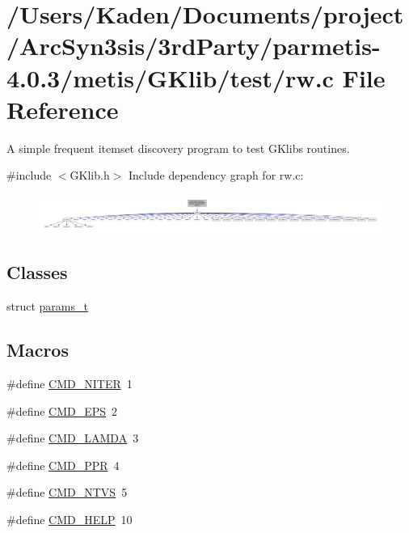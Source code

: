 \hypertarget{a00864}{}\section{/\+Users/\+Kaden/\+Documents/project/\+Arc\+Syn3sis/3rd\+Party/parmetis-\/4.0.3/metis/\+G\+Klib/test/rw.c File Reference}
\label{a00864}


A simple frequent itemset discovery program to test G\+Klib\textquotesingle{}s routines.  


{\ttfamily \#include $<$G\+Klib.\+h$>$}\newline
Include dependency graph for rw.\+c\+:\nopagebreak
\begin{figure}[H]
\begin{center}
\leavevmode
\includegraphics[width=350pt]{a00865}
\end{center}
\end{figure}
\subsection*{Classes}
\begin{DoxyCompactItemize}
\item 
struct \hyperlink{a00706}{params\+\_\+t}
\end{DoxyCompactItemize}
\subsection*{Macros}
\begin{DoxyCompactItemize}
\item 
\#define \hyperlink{a00864_a26e9eb9179a727d896d5524a20dd80fd}{C\+M\+D\+\_\+\+N\+I\+T\+ER}~1
\item 
\#define \hyperlink{a00864_aebb6662065473a711abeccb460b3979c}{C\+M\+D\+\_\+\+E\+PS}~2
\item 
\#define \hyperlink{a00864_a40a2b39955e074d183af22cf8f2655e3}{C\+M\+D\+\_\+\+L\+A\+M\+DA}~3
\item 
\#define \hyperlink{a00864_a07506f90aa0c9ef311583249192060a0}{C\+M\+D\+\_\+\+P\+PR}~4
\item 
\#define \hyperlink{a00864_a0b30b0d2a604e21e00e636a15eb85c3f}{C\+M\+D\+\_\+\+N\+T\+VS}~5
\item 
\#define \hyperlink{a00864_a42553adbbb23a03ca876697c00ea44b1}{C\+M\+D\+\_\+\+H\+E\+LP}~10
\end{DoxyCompactItemize}
